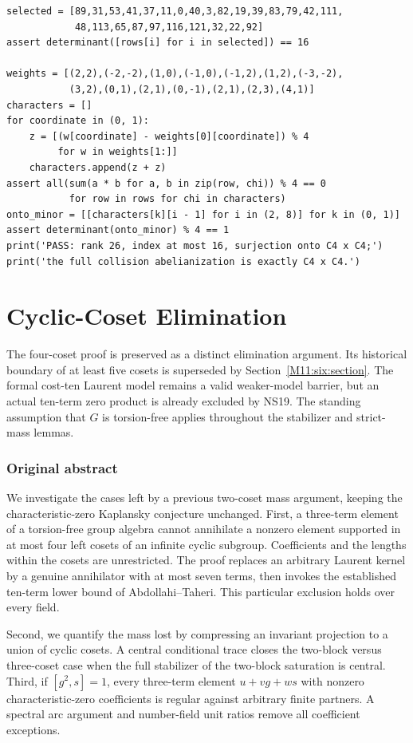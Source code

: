\documentclass[11pt,a4paper,oneside]{report}
\theoremstyle{definition}
\theoremstyle{remark}
\newcommand{\compilationnote}[1]{\medskip\noindent{\small\color{accent}\textbf{Compilation note --- 23 November 2026.}}\par
{\small #1}\par\medskip}
\begin{document}
\begin{lstlisting}
selected = [89,31,53,41,37,11,0,40,3,82,19,39,83,79,42,111,
            48,113,65,87,97,116,121,32,22,92]
assert determinant([rows[i] for i in selected]) == 16

weights = [(2,2),(-2,-2),(1,0),(-1,0),(-1,2),(1,2),(-3,-2),
           (3,2),(0,1),(2,1),(0,-1),(2,1),(2,3),(4,1)]
characters = []
for coordinate in (0, 1):
    z = [(w[coordinate] - weights[0][coordinate]) % 4
         for w in weights[1:]]
    characters.append(z + z)
assert all(sum(a * b for a, b in zip(row, chi)) % 4 == 0
           for row in rows for chi in characters)
onto_minor = [[characters[k][i - 1] for i in (2, 8)] for k in (0, 1)]
assert determinant(onto_minor) % 4 == 1
print('PASS: rank 26, index at most 16, surjection onto C4 x C4;')
print('the full collision abelianization is exactly C4 x C4.')
\end{lstlisting}


\chapter{Cyclic-Coset Elimination}\label{chap:M09}
\par
\compilationnote{The four-coset proof is preserved as a distinct elimination argument.
Its historical boundary of at least five cosets is superseded by
Section~\ref{M11:six:section}. The formal cost-ten Laurent model remains
a valid weaker-model barrier, but an actual ten-term zero product is
already excluded by NS19. The standing assumption that $G$ is
torsion-free applies throughout the stabilizer and strict-mass lemmas.}
\subsection*{Original abstract}
We investigate the cases left by a previous two-coset mass argument,
keeping the characteristic-zero Kaplansky conjecture unchanged.
First, a three-term element of a torsion-free group algebra cannot
annihilate a nonzero element supported in at most four left cosets
of an infinite cyclic subgroup. Coefficients and the lengths within
the cosets are unrestricted. The proof replaces an arbitrary Laurent
kernel by a genuine annihilator with at most seven terms, then invokes
the established ten-term lower bound of Abdollahi--Taheri. This
particular exclusion holds over every field.

Second, we quantify the mass lost by compressing an invariant
projection to a union of cyclic cosets. A central conditional trace
closes the two-block versus three-coset case when the full stabilizer
of the two-block saturation is central. Third, if $[g^2,s]=1$, every
three-term element $u+vg+ws$ with nonzero characteristic-zero
coefficients is regular against arbitrary finite partners. A spectral
arc argument and number-field unit ratios remove all coefficient
exceptions.
\end{document}
